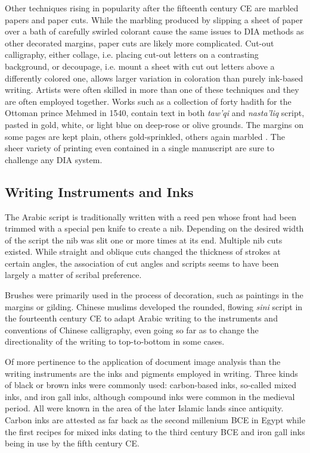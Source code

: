 Other techniques rising in popularity after the fifteenth century CE are
marbled papers and paper cuts. While the marbling produced by slipping a sheet
of paper over a bath of carefully swirled colorant cause the same issues to DIA
methods as other decorated margins, paper cuts are likely more complicated.
Cut-out calligraphy, either collage, i.e. placing cut-out letters on a
contrasting background, or decoupage, i.e. mount a sheet with cut out letters
above a differently colored one, allows larger variation in coloration than
purely ink-based writing. Artists were often skilled in more than one of these
techniques and they are often employed together. Works such as a collection of
forty hadith for the Ottoman prince Mehmed in 1540, contain text in both
\emph{taw'qi} and \emph{nasta'liq} script, pasted in gold, white, or light blue
on deep-rose or olive grounds. The margins on some pages are kept plain, others
gold-sprinkled, others again marbled \cite[pg. 52-56]{blair2006islamic}. The
sheer variety of printing even contained in a single manuscript are sure to
challenge any DIA system.

\subsection{Writing Instruments and Inks}

The Arabic script is traditionally written with a reed pen whose front had been
trimmed with a special pen knife to create a nib. Depending on the desired
width of the script the nib was slit one or more times at its end. Multiple nib
cuts existed. While straight and oblique cuts changed the thickness of strokes
at certain angles, the association of cut angles and scripts seems to have been
largely a matter of scribal preference\cite[pg. 42]{gacek2009arabic}.

Brushes were primarily used in the process of decoration, such as paintings in
the margins or gilding. Chinese muslims developed the rounded, flowing
\emph{sini} script in the fourteenth century CE to adapt Arabic writing to the
instruments and conventions of Chinese calligraphy, even going so far as to
change the directionality of the writing to top-to-bottom in some
cases\cite[pg. 29-30]{ghoname2012sini}.

Of more pertinence to the application of document image analysis than the
writing instruments are the inks and pigments employed in writing. Three kinds
of black or brown inks were commonly used: carbon-based inks, so-called mixed
inks, and iron gall inks, although compound inks were common in the medieval
period\cite[pg. 62-63]{blair2006islamic}. All were known in the area of the
later Islamic lands since antiquity. Carbon inks are attested as far back as
the second millenium BCE in Egypt while the first recipes for mixed inks dating
to the third century BCE and iron gall inks being in use by the fifth century
CE\cite{christiansen2017manufacture}.

